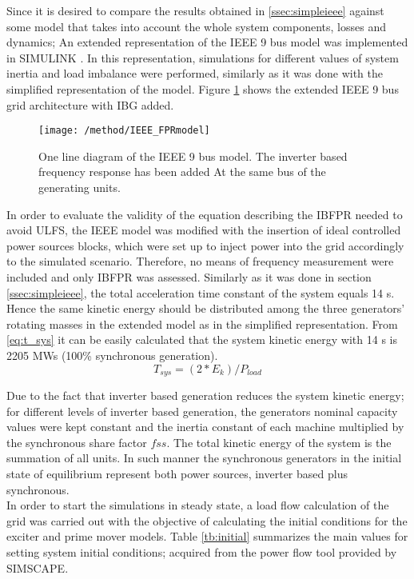 Since it is desired to compare the results obtained in \ref{ssec:simpleieee} against some model that takes into account the whole system components, losses and dynamics; An  extended representation of the IEEE 9 bus model was implemented in SIMULINK \cite{delavari2018simscape}. In this representation, simulations for different values of system inertia and load imbalance were performed, similarly as it was done with the simplified representation of the model. Figure \ref{fig:ieeeext} shows the extended IEEE 9 bus grid architecture with IBG added.\\
\begin{figure}[h]
	\centering
	\texttt{[image: /method/IEEE\_FPRmodel]}
	\caption{One line diagram of the IEEE 9 bus model. The inverter based frequency response has been added At the same bus of the generating units.}
	\label{fig:ieeeext}
\end{figure}
In order to evaluate the validity of the equation describing the IBFPR needed to avoid ULFS, the IEEE model was modified with the insertion of ideal controlled power sources blocks, which were set up to inject power into the grid accordingly to the simulated scenario. Therefore, no means of frequency measurement were included and only IBFPR was assessed.
Similarly as it was done in section \ref{ssec:simpleieee}, the total acceleration time constant of the system equals 14 s. Hence the same kinetic energy should be distributed among the three generators' rotating masses in the extended model as in the simplified representation. From \eqref{eq:t_sys} it can be easily calculated that the system kinetic energy with 14 s is 2205 MWs (100\% synchronous generation).
\begin{equation}
	\label{eq:t_sys}
	T_{sys}=(2*E_{k})/P_{load}
\end{equation}

Due to the fact that inverter based generation reduces the system kinetic energy; for different levels of inverter based generation,  the generators nominal capacity values were kept constant and the inertia constant of each machine multiplied by the synchronous share factor $ fss $. The total kinetic energy of the system is the summation of all units. In such manner the synchronous generators in the initial state of equilibrium represent both power sources, inverter based plus synchronous.\\
In order to start the simulations in steady state, a load flow calculation of the grid was carried out with the objective of calculating the initial conditions for the exciter and prime mover models.
Table \ref{tb:initial} summarizes the main values for setting system initial conditions; acquired from the power flow tool provided by SIMSCAPE.


